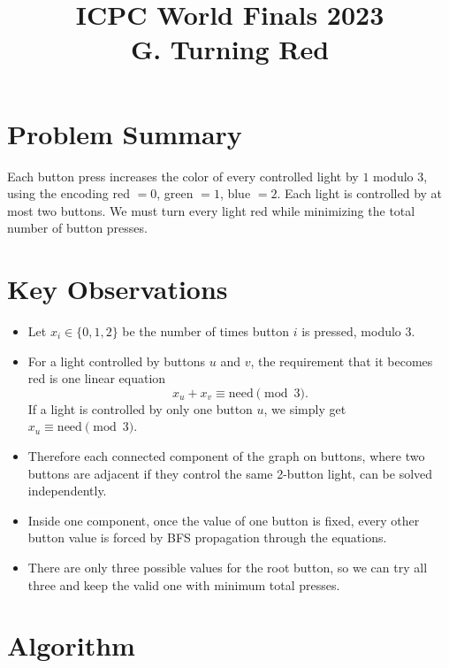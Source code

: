 \documentclass[11pt]{article}
\title{ICPC World Finals 2023\\G. Turning Red}
\author{}
\date{}
\begin{document}
\maketitle

\section*{Problem Summary}

Each button press increases the color of every controlled light by $1$ modulo $3$, using the encoding
red $=0$, green $=1$, blue $=2$. Each light is controlled by at most two buttons. We must turn every
light red while minimizing the total number of button presses.

\section*{Key Observations}

\begin{itemize}[leftmargin=*]
    \item Let $x_i \in \{0,1,2\}$ be the number of times button $i$ is pressed, modulo $3$.
    \item For a light controlled by buttons $u$ and $v$, the requirement that it becomes red is one linear
    equation
    \[
    x_u+x_v \equiv \text{need} \pmod 3.
    \]
    If a light is controlled by only one button $u$, we simply get $x_u \equiv \text{need} \pmod 3$.
    \item Therefore each connected component of the graph on buttons, where two buttons are adjacent if
    they control the same 2-button light, can be solved independently.
    \item Inside one component, once the value of one button is fixed, every other button value is forced by
    BFS propagation through the equations.
    \item There are only three possible values for the root button, so we can try all three and keep the valid
    one with minimum total presses.
\end{itemize}

\section*{Algorithm}
\end{document}
